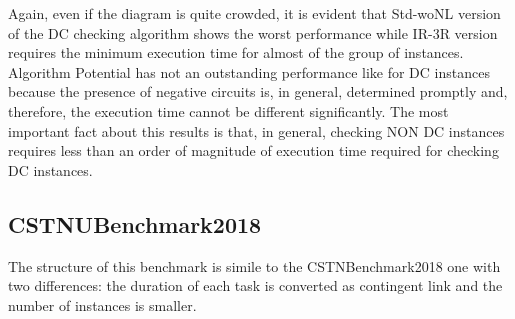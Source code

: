 \documentclass[a4paper,11pt]{article}
\begin{document}
Again, even if the diagram is quite crowded, it is evident that \textrm{Std-woNL} version of the DC checking algorithm shows the worst performance while
\textrm{IR-3R} version requires the minimum execution time for almost of the group of instances. 
Algorithm \textrm{Potential} has not an outstanding performance like for DC instances because the presence of negative circuits is, in general, determined promptly and, therefore, the execution time cannot be different significantly.
The most important fact about this results is that, in general, checking NON DC instances requires 
less than an order of magnitude of execution time required for checking DC instances. 




\subsection{CSTNUBenchmark2018}

The structure of this benchmark is simile to the CSTNBenchmark2018 one with two differences: the duration of each task is converted as contingent link and the number of instances is smaller.
\end{document}
